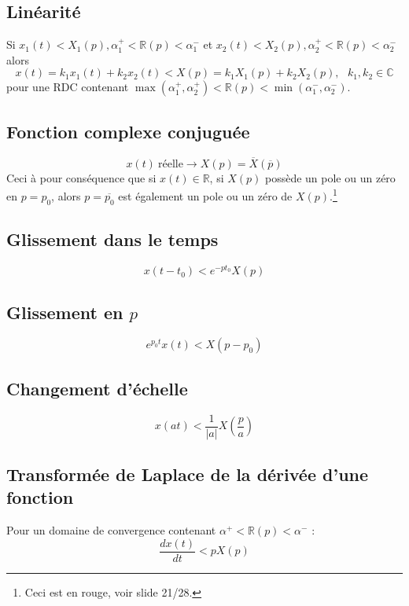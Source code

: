 	\subsection{Linéarité}
	Si $x_1(t) \lt X_1(p), \alpha_1^+ < \mathbb{R}(p) < \alpha_1^-$ et $x_2(t) \lt X_2(p),
	\alpha_2^+ < \mathbb{R}(p) < \alpha_2^-$ alors 
	\begin{equation}
	x(t) = k_1x_1(t) + k_2x_2(t) \lt X(p) = k_1X_1(p) + k_2X_2(p),\ \ \ k_1,k_2\in\mathbb{C}
	\end{equation}
	pour une RDC contenant $\max(\alpha_1^+,\alpha_2^+)< \mathbb{R}(p) < \min(\alpha^-_1,\alpha^-_2)$.
	
	
	\subsection{Fonction complexe conjuguée}
	\begin{equation}
	x(t)\ \text{réelle} \rightarrow X(p) = \overline{X}(\overline{p})
	\end{equation}
	Ceci à pour conséquence que si $x(t) \in \mathbb{R}$, si $X(p)$ possède un pole ou un 
	zéro en $p=p_0$, alors $p=\overline{p_0}$ est également un pole ou un zéro de $X(p)$.\footnote{
	Ceci est en rouge, voir slide 21/28.}
	
	
	\subsection{Glissement dans le temps}	
	\begin{equation}
	x(t-t_0) \lt e^{-pt_0}X(p)
	\end{equation}
	
	
	\subsection{Glissement en $p$}
	\begin{equation}
	e^{p_0t}x(t) \lt X(p-p_0)
	\end{equation}
	
	
	
	\subsection{Changement d'échelle}
	\begin{equation}
	x(at) \lt \frac{1}{|a|}X\left(\frac{p}{a}\right)
	\end{equation}
	
	
	\subsection{Transformée de Laplace de la dérivée d'une fonction}
	Pour un domaine de convergence contenant $\alpha^+<\mathbb{R}(p)<\alpha^-$ :
	\begin{equation}
	\frac{dx(t)}{dt} \lt pX(p)
	\end{equation}
	
